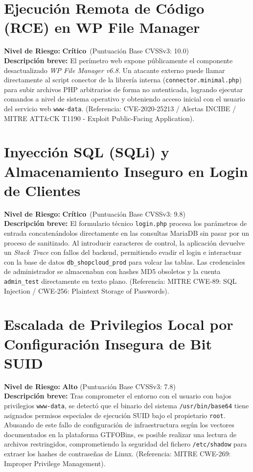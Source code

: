 \documentclass[11pt,a4paper]{report}
\begin{document}
\section{Ejecución Remota de Código (RCE) en WP File Manager}
\textbf{Nivel de Riesgo:} \color{critred}\textbf{Crítico}\color{black}\ (Puntuación Base CVSSv3: 10.0) \\
\textbf{Descripción breve:} El perímetro web expone públicamente el componente desactualizado \textit{WP File Manager v6.8}. Un atacante externo puede llamar directamente al script conector de la librería interna (\texttt{connector.minimal.php}) para subir archivos PHP arbitrarios de forma no autenticada, logrando ejecutar comandos a nivel de sistema operativo y obteniendo acceso inicial con el usuario del servicio web \texttt{www-data}. (Referencia: CVE-2020-25213 / Alertas INCIBE / MITRE ATT\&CK T1190 - Exploit Public-Facing Application).

\section{Inyección SQL (SQLi) y Almacenamiento Inseguro en Login de Clientes}
\textbf{Nivel de Riesgo:} \color{critred}\textbf{Crítico}\color{black}\ (Puntuación Base CVSSv3: 9.8) \\
\textbf{Descripción breve:} El formulario técnico \texttt{login.php} procesa los parámetros de entrada concatenándolos directamente en las consultas MariaDB sin pasar por un proceso de sanitizado. Al introducir caracteres de control, la aplicación devuelve un \textit{Stack Trace} con fallos del backend, permitiendo evadir el login e interactuar con la base de datos \texttt{db\_shopcloud\_prod} para volcar las tablas. Las credenciales de administrador se almacenaban con hashes MD5 obsoletos y la cuenta \texttt{admin\_test} directamente en texto plano. (Referencia: MITRE CWE-89: SQL Injection / CWE-256: Plaintext Storage of Passwords).

\section{Escalada de Privilegios Local por Configuración Insegura de Bit SUID}
\textbf{Nivel de Riesgo:} \textbf{Alto} (Puntuación Base CVSSv3: 7.8) \\
\textbf{Descripción breve:} Tras comprometer el entorno con el usuario con bajos privilegios \texttt{www-data}, se detectó que el binario del sistema \texttt{/usr/bin/base64} tiene asignados permisos especiales de ejecución SUID bajo el propietario \texttt{root}. Abusando de este fallo de configuración de infraestructura según los vectores documentados en la plataforma GTFOBins, es posible realizar una lectura de archivos restringidos, comprometiendo la seguridad del fichero \texttt{/etc/shadow} para extraer los hashes de contraseñas de Linux. (Referencia: MITRE CWE-269: Improper Privilege Management).
\end{document}

